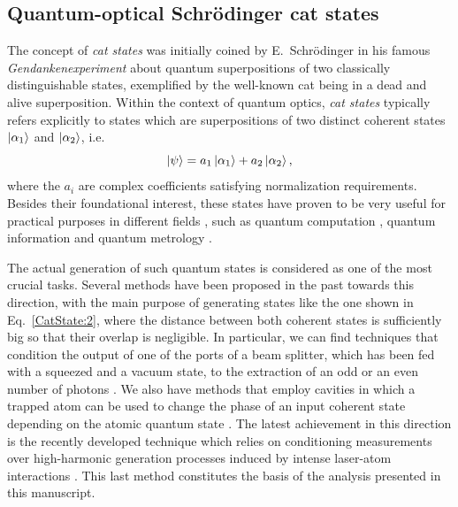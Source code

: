 \subsection{Quantum-optical Schrödinger cat states}
The concept of \emph{cat states} was initially coined by E.\ Schrödinger in his famous \emph{Gendankenexperiment} \cite{Schrodinger1935} about quantum superpositions of two classically distinguishable states, exemplified by the well-known cat being in a dead and alive superposition. Within the context of quantum optics, \emph{cat states} typically refers explicitly to states which are superpositions of two distinct coherent states $\ket{\alpha_1}$ and $\ket{\alpha_2}$, i.e.
\begin{equation}\label{CatState:2}
    \ket{\psi} = 
                a_1 \ket{\alpha_1} 
                + a_2 \ket{\alpha_2},
\end{equation}
where the $a_i$ are complex coefficients satisfying normalization requirements. Besides their foundational interest, these states have proven to be very useful for practical purposes in different fields \cite{Gilchrist2004, Lvovsky2020}, such as quantum computation \cite{Ralph2003}, quantum information \cite{Sanders1992, Jeong2003,Stobinska2007} and quantum metrology \cite{Munro2002}.

The actual generation of such quantum states is considered as one of the most crucial tasks. Several methods have been proposed in the past towards this direction, with the main purpose of generating states like the one shown in Eq.~\eqref{CatState:2}, where the distance between both coherent states is sufficiently big so that their overlap is negligible. In particular, we can find techniques that condition the output of one of the ports of a beam splitter, which has been fed with a squeezed and a vacuum state, to the extraction of an odd or an even number of photons \cite{Dakna1997, Ourjoumtsev2006}. We also have methods that employ cavities in which a trapped atom can be used to change the phase of an input coherent state depending on the atomic quantum state \cite{Hacker2019}. The latest achievement in this direction is the recently developed technique which relies on conditioning measurements over high-harmonic generation processes induced by intense laser-atom interactions \cite{Lewenstein2020}. This last method constitutes the basis of the analysis presented in this manuscript.

